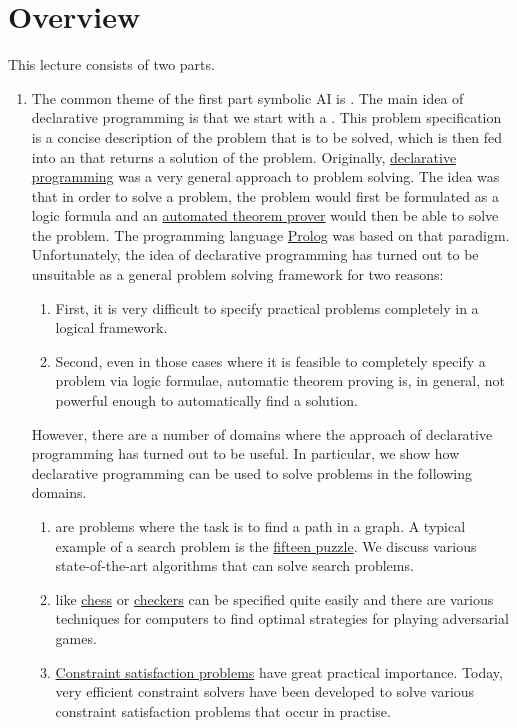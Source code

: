 \section{Overview}
This lecture consists of two parts.
\begin{enumerate}
\item The common theme of the first part symbolic AI is .  
      The main idea of declarative programming is that we start with a .
      This problem specification is a concise description of the problem that is to be solved, which is
      then fed into an  that returns a solution of the problem.  Originally, 
      \href{https://en.wikipedia.org/wiki/Declarative_programming}{declarative programming} was a very general
      approach to problem solving.  The idea was that in order to solve a problem, the problem would first be
      formulated as a logic formula and an
      \href{https://en.wikipedia.org/wiki/Automated_theorem_proving}{automated theorem prover} would then be
      able to solve the problem.  The programming language \href{https://en.wikipedia.org/wiki/Prolog}{Prolog}
      was based on that paradigm.  Unfortunately, the idea of declarative programming has
      turned out to be unsuitable as a general problem solving framework for two reasons:
      \begin{enumerate}
      \item First, it is very difficult to specify practical problems completely in a logical framework.
      \item Second, even in those cases where it is feasible to completely specify a problem via logic formulae,
            automatic theorem proving is, in general, not powerful enough to automatically find a solution. 
      \end{enumerate}
      However, there are a number of domains where the approach of declarative programming has turned out to be
      useful.  In particular, we show how declarative programming can be used to solve problems in the
      following domains.
      \begin{enumerate}
      \item {} are problems where the task is to find a path in a graph.  A typical example of a
            search problem is the \href{https://en.wikipedia.org/wiki/15_puzzle}{fifteen puzzle}.
            We discuss various state-of-the-art algorithms that can solve search problems.
      \item {} like \href{https://en.wikipedia.org/wiki/Chess}{chess} or
            \href{https://en.wikipedia.org/wiki/checkers}{checkers} can be specified quite easily and there are
            various techniques for computers to find optimal strategies for playing adversarial games.
      \item \href{https://en.wikipedia.org/wiki/Constraint_satisfaction_problem}{Constraint satisfaction problems} 
            have great practical importance.  Today, very efficient constraint solvers have been developed to
            solve various constraint satisfaction problems that occur in practise.


\end{enumerate}
\end{enumerate}
